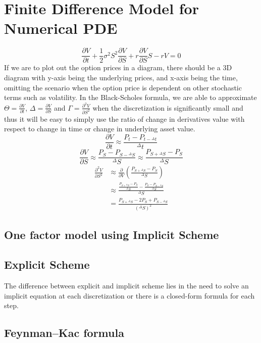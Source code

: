 \section{Finite Difference Model for Numerical PDE}
$$\frac{\partial V}{\partial t}+\frac{1}{2}\sigma^{2}S^{2}\frac{\partial V}{\partial S}+r\frac{\partial V}{\partial S}S- rV = 0$$
If we are to plot out the option prices in a diagram, there should be a 3D diagram with y-axis being the underlying prices, and x-axis being the time, omitting the scenario when the option price is dependent on other stochastic terms such as volatility.
In the Black-Scholes formula, we are able to approximate $\Theta = \frac{\partial V}{\partial t}$, $\Delta = \frac{\partial V}{\partial S}$ and $\Gamma = \frac{\partial^{2} V}{\partial S^{2}}$ when the discretization is significantly small and thus it will be easy to simply use the ratio of change in derivatives value with respect to change in time or change in underlying asset value.\\
$$\frac{\partial V}{\partial t} \approx \frac{P_{t} - P_{t-{^{\Delta}t}}}{^{\Delta}t}$$
$$\frac{\partial V}{\partial S} \approx \frac{P_{S} - P_{S-{^{\Delta}S}}}{^{\Delta}S} \approx \frac{P_{S+{^{\Delta}S}} - P_{S}}{^{\Delta}S}$$
\begin{equation}
\begin{split}
\frac{\partial^{2} V}{\partial S^{2}}
&\approx \frac{\partial}{\partial V}(\frac{P_{S+{^{\Delta}S}} - P_{S}}{^{\Delta}S})\\
&\approx \frac{\frac{P_{S+{^{\Delta}S}} - P_{S}}{^{\Delta}S} - \frac{P_{S} - P_{S-{^{\Delta}S}}}{^{\Delta}S}}{^{\Delta}S}\\
&= \frac{P_{S+{^{\Delta}S}} - 2P_{S} + P_{S-{^{\Delta}S}}}{(^{\Delta}S)^{2}}
\end{split}
\end{equation}

\subsection{One factor model using Implicit Scheme}
\newpage
\subsection{Explicit Scheme}
The difference between explicit and implicit scheme lies in the need to solve an implicit equation at each discretization or there is a closed-form formula for each step.
\newpage
\subsection{Feynman–Kac formula}
\newpage
